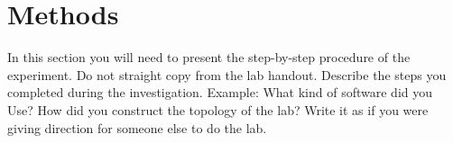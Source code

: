 \section{Methods}
In this section you will need to present the step-by-step procedure of the experiment. Do not straight copy from the lab handout. Describe the steps you completed during the investigation. Example: What kind of software did you Use? How did you construct the topology of the lab? Write it as if you were giving direction for someone else to do the lab.

